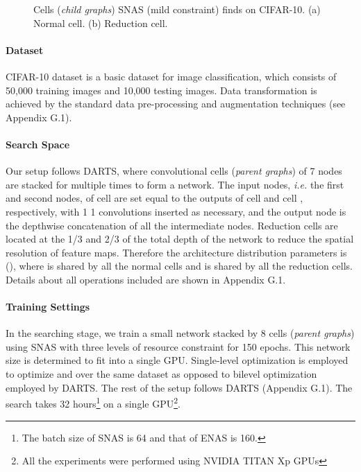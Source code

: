 \documentclass{article} \usepackage{iclr2019_conference,times}
\begin{document}
\begin{figure}[h]
  \centering
  \caption{Cells (\textit{child graphs}) SNAS (mild constraint) finds on CIFAR-10. (a) Normal cell. (b) Reduction cell.}
  \label{fig:normal_reduction}
\end{figure}

\paragraph{Dataset}

CIFAR-10 dataset \citep{krizhevsky2009learning} is a basic dataset for image classification, which consists of 50,000 training images and 10,000 testing images. Data transformation is achieved by the standard data pre-processing and augmentation techniques (see Appendix G.1).

\paragraph{Search Space}

Our setup follows DARTS, where convolutional cells (\textit{parent graphs}) of 7 nodes are stacked for multiple times to form a network. The input nodes, \textit{i.e.} the first and second nodes, of cell  are set equal to the outputs of cell  and cell , respectively, with 1  1 convolutions inserted as necessary, and the output node is the depthwise concatenation of all the intermediate nodes. Reduction cells are located at the 1/3 and 2/3 of the total depth of the network to reduce the spatial resolution of feature maps. Therefore the architecture distribution parameters is (), where  is shared by all the normal cells and  is shared by all the reduction cells. Details about all operations included are shown in Appendix G.1.

\paragraph{Training Settings}

In the searching stage, we train a small network stacked by 8 cells (\textit{parent graphs}) using SNAS with three levels of resource constraint for 150 epochs. This network size is determined to fit into a single GPU. Single-level optimization is employed to optimize  and  over the same dataset as opposed to bilevel optimization employed by DARTS. The rest of the setup follows DARTS (Appendix G.1). The search takes 32 hours\footnote{The batch size of SNAS is 64 and that of ENAS is 160.} on a single GPU\footnote{All the experiments were performed using NVIDIA TITAN Xp GPUs}.
\end{document}
